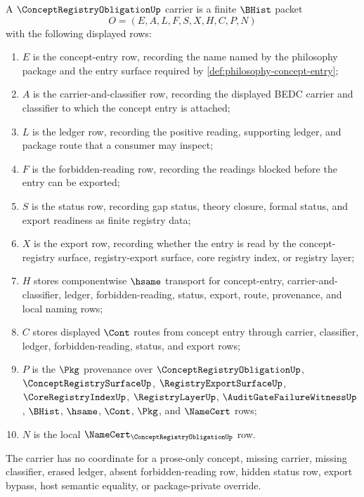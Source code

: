 \begin{definition}
\label{def:concept-registry-obligation-carrier}
A $\ConceptRegistryObligationUp$ carrier is a finite $\BHist$ packet
$$
O=(E,A,L,F,S,X,H,C,P,N)
$$
with the following displayed rows:
\begin{enumerate}
\item $E$ is the concept-entry row, recording the name named by the philosophy package and the entry surface required by \autoref{def:philosophy-concept-entry};
\item $A$ is the carrier-and-classifier row, recording the displayed BEDC carrier and classifier to which the concept entry is attached;
\item $L$ is the ledger row, recording the positive reading, supporting ledger, and package route that a consumer may inspect;
\item $F$ is the forbidden-reading row, recording the readings blocked before the entry can be exported;
\item $S$ is the status row, recording gap status, theory closure, formal status, and export readiness as finite registry data;
\item $X$ is the export row, recording whether the entry is read by the concept-registry surface, registry-export surface, core registry index, or registry layer;
\item $H$ stores componentwise $\hsame$ transport for concept-entry, carrier-and-classifier, ledger, forbidden-reading, status, export, route, provenance, and local naming rows;
\item $C$ stores displayed $\Cont$ routes from concept entry through carrier, classifier, ledger, forbidden-reading, status, and export rows;
\item $P$ is the $\Pkg$ provenance over $\ConceptRegistryObligationUp$, $\ConceptRegistrySurfaceUp$, $\RegistryExportSurfaceUp$, $\CoreRegistryIndexUp$, $\RegistryLayerUp$, $\AuditGateFailureWitnessUp$, $\BHist$, $\hsame$, $\Cont$, $\Pkg$, and $\NameCert$ rows;
\item $N$ is the local $\NameCert_{\ConceptRegistryObligationUp}$ row.
\end{enumerate}
The carrier has no coordinate for a prose-only concept, missing carrier, missing classifier, erased ledger, absent forbidden-reading row, hidden status row, export bypass, host semantic equality, or package-private override.
\end{definition}

